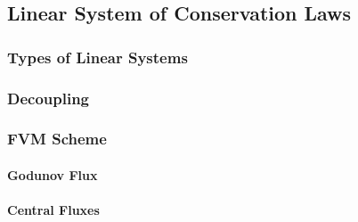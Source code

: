 \documentclass[
  fourColumns,
  landscape
]{formularyETH/formularyETH}
\begin{document}
      \subsection{Linear System of Conservation Laws}\label{subsubsec:linear_system_of_conservation_laws}
      
      
      \subsubsection{Types of Linear Systems}\label{subsubsubsec:types_of_linear_systems}
        
      \subsubsection{Decoupling}\label{subsubsubsec:decoupeling}
        
        \label{para:riemann_problems}
        
      \subsubsection{FVM Scheme}\label{subsec:fvm_scheme}
        
        \label{subsubsubsec:cfl_condition}
        
        \label{subsubsubsec:fluxes}
          \paragraph{Godunov Flux}\label{para:gudonov_flux}
          
          \paragraph{Central Fluxes}\label{subsubsec:central_fluxes}
            
            
\end{document}
